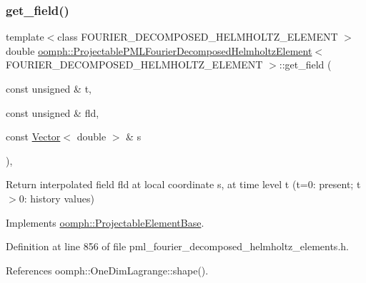 \subsubsection{\texorpdfstring{get\+\_\+field()}{get\_field()}}
{\footnotesize\ttfamily template$<$class F\+O\+U\+R\+I\+E\+R\+\_\+\+D\+E\+C\+O\+M\+P\+O\+S\+E\+D\+\_\+\+H\+E\+L\+M\+H\+O\+L\+T\+Z\+\_\+\+E\+L\+E\+M\+E\+NT $>$ \\
double \hyperlink{classoomph_1_1ProjectablePMLFourierDecomposedHelmholtzElement}{oomph\+::\+Projectable\+P\+M\+L\+Fourier\+Decomposed\+Helmholtz\+Element}$<$ F\+O\+U\+R\+I\+E\+R\+\_\+\+D\+E\+C\+O\+M\+P\+O\+S\+E\+D\+\_\+\+H\+E\+L\+M\+H\+O\+L\+T\+Z\+\_\+\+E\+L\+E\+M\+E\+NT $>$\+::get\+\_\+field (\begin{DoxyParamCaption}\item[{const unsigned \&}]{t,  }\item[{const unsigned \&}]{fld,  }\item[{const \hyperlink{classoomph_1_1Vector}{Vector}$<$ double $>$ \&}]{s }\end{DoxyParamCaption})\hspace{0.3cm}{\ttfamily [inline]}, {\ttfamily [virtual]}}



Return interpolated field fld at local coordinate s, at time level t (t=0\+: present; t$>$0\+: history values) 



Implements \hyperlink{classoomph_1_1ProjectableElementBase_ae4da5b565b6d333be2f5920f7be763cd}{oomph\+::\+Projectable\+Element\+Base}.



Definition at line 856 of file pml\+\_\+fourier\+\_\+decomposed\+\_\+helmholtz\+\_\+elements.\+h.



References oomph\+::\+One\+Dim\+Lagrange\+::shape().

\mbox{\label{classoomph_1_1ProjectablePMLFourierDecomposedHelmholtzElement_aa2dd1c8b7262a2719d3c181ccac74c7e}} 
